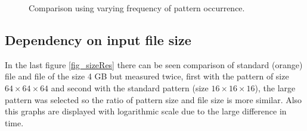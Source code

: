 \begin{figure}
\begin{minipage}{.5\linewidth}
\centering
{}
\end{minipage}%
\begin{minipage}{.5\linewidth}
\centering
{}
\end{minipage}\par\medskip

\caption{Comparison using varying frequency of pattern occurrence.}
\label{fig_patRes}
\end{figure}

\subsection{Dependency on input file size}
In the last figure \ref{fig_sizeRes} there can be seen comparison of standard (orange) file and file of the size 4 GB but measured twice, first with the pattern of size $64\times64\times64$ and second with the standard pattern (size $16\times16\times16$), the large pattern was selected so the ratio of pattern size and file size is more similar. Also this graphs are displayed with logarithmic scale due to the large difference in time. 

